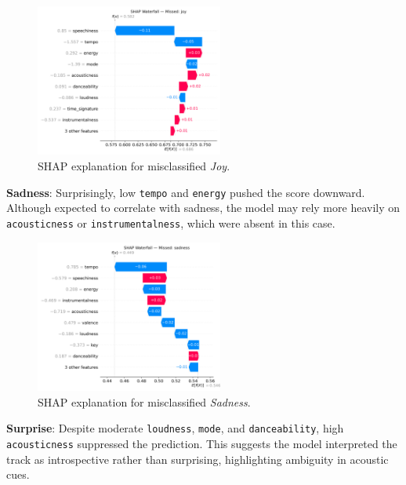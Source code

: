 \documentclass{article}
\begin{document}
\begin{figure}[H]
\centering
\includegraphics[width=0.55\textwidth]{Graphics/shap_missed_labels/joy_missed_shap_waterfall.png}
\caption{SHAP explanation for misclassified \textit{Joy}.}
\label{fig:shap_joy}
\end{figure}

\textbf{Sadness}: Surprisingly, low \texttt{tempo} and \texttt{energy} pushed the score downward. Although expected to correlate with sadness, the model may rely more heavily on \texttt{acousticness} or \texttt{instrumentalness}, which were absent in this case.

\begin{figure}[H]
\centering
\includegraphics[width=0.55\textwidth]{Graphics/shap_missed_labels/sadness_missed_shap_waterfall.png}
\caption{SHAP explanation for misclassified \textit{Sadness}.}
\label{fig:shap_sadness}
\end{figure}

\textbf{Surprise}: Despite moderate \texttt{loudness}, \texttt{mode}, and \texttt{danceability}, high \texttt{acousticness} suppressed the prediction. This suggests the model interpreted the track as introspective rather than surprising, highlighting ambiguity in acoustic cues.
\end{document}

